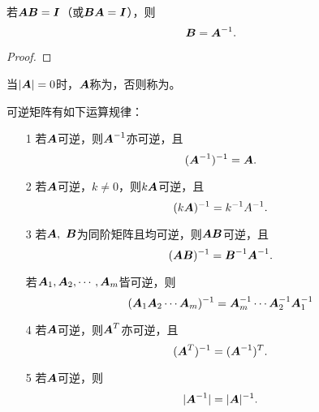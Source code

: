 \begin{frame}
\begin{tuilun}
  若$\MA\MB = \MI$（或$\MB\MA=\MI$），则
  $$
  \MB = \MA^{-1}.
  $$
\end{tuilun}
\begin{proof}

\end{proof}

\end{frame}

\begin{frame}
\begin{dingyi}[奇异阵与非奇异阵]
  当$|\MA|=0$时，$\MA$称为，否则称为。
\end{dingyi}

\pause 
\begin{zhu}
\end{zhu}
\end{frame}

\begin{frame}
\begin{dingli}可逆矩阵有如下运算规律：
  \begin{enumerate}
  \item[1] 若$\MA$可逆，则$\MA^{-1}$亦可逆，且
    $$(\MA^{-1})^{-1}=\MA.$$
  \item[2] 若$\MA$可逆，$k\ne 0$，则$k\MA$可逆，且
    $$(k\MA)^{-1}= k^{-1}A^{-1}.$$
  \item[3] 若$\MA, ~\MB$为同阶矩阵且均可逆，则$\MA\MB$可逆，且
    $$(\MA\MB)^{-1} = \MB^{-1}\MA^{-1}.$$
  \item[] 若$\MA_1,\MA_2,\cd,\MA_m$皆可逆，则
    $$
    (\MA_1\MA_2\cd\MA_m)^{-1}=\MA_m^{-1}\cd\MA_2^{-1}\MA_1^{-1}
    $$
  \item[4] 若$\MA$可逆，则$\MA^T$亦可逆，且
    $$(\MA^T)^{-1}=(\MA^{-1})^T.$$ 
  \item[5] 若$\MA$可逆，则
    $$|\MA^{-1}|=|\MA|^{-1}.$$
  \end{enumerate}
\end{dingli}
\end{frame}

